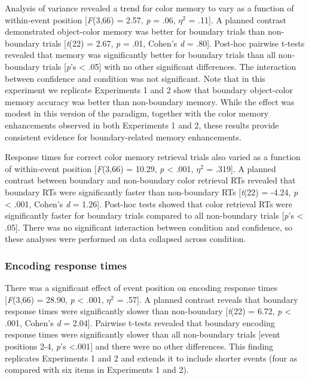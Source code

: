Analysis of variance revealed a trend for color memory to vary as a
function of within-event position {[}\emph{F}(3,66) = 2.57, \emph{p} =
.06, \(\eta^{2}\) = .11{]}. A planned contrast demonstrated object-color
memory was better for boundary trials than non-boundary trials
{[}\emph{t}(22) = 2.67, \emph{p} = .01, Cohen's \emph{d} = .80{]}.
Post-hoc pairwise t-tests revealed that memory was significantly better
for boundary trials than all non-boundary trials {[}\emph{p}'s
\textless{} .05{]} with no other significant differences. The
interaction between confidence and condition was not significant. Note
that in this experiment we replicate Experiments 1 and 2 show that
boundary object-color memory accuracy was better than non-boundary
memory. While the effect was modest in this version of the paradigm,
together with the color memory enhancements observed in both Experiments
1 and 2, these results provide consistent evidence for boundary-related
memory enhancements.

Response times for correct color memory retrieval trials also varied as
a function of within-event position {[}\emph{F}(3,66) = 10.29, \emph{p}
\textless{} .001, \(\eta^{2}\) = .319{]}. A planned contrast between
boundary and non-boundary color retrieval RTs revealed that boundary RTs
were significantly faster than non-boundary RTs {[}\emph{t}(22) = -4.24,
\emph{p} \textless{} .001, Cohen's \emph{d} = 1.26{]}. Post-hoc tests
showed that color retrieval RTs were significantly faster for boundary
trials compared to all non-boundary trials {[}\emph{p}'s \textless{}
.05{]}. There was no significant interaction between condition and
confidence, so these analyses were performed on data collapsed across
condition.

\subsubsection{Encoding response times}\label{encoding-response-times-2}

There was a significant effect of event position on encoding response
times {[}\emph{F}(3,66) = 28.90, \emph{p} \textless{} .001, \(\eta^{2}\)
= .57{]}. A planned contrast reveals that boundary response times were
significantly slower than non-boundary {[}\emph{t}(22) = 6.72, \emph{p}
\textless{} .001, Cohen's \emph{d} = 2.04{]}. Pairwise t-tests revealed
that boundary encoding response times were significantly slower than all
non-boundary trials {[}event positions 2-4, \emph{p}'s
\textless{}.001{]} and there were no other differences. This finding
replicates Experiments 1 and 2 and extends it to include shorter events
(four as compared with six items in Experiments 1 and 2).

